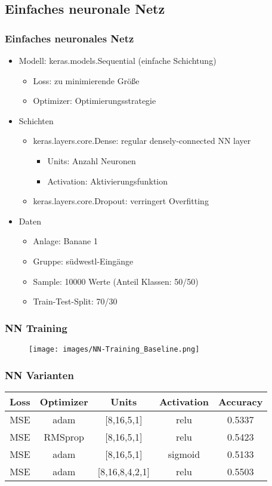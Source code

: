 \documentclass[utf8x, xcolor=dvipsnames]{beamer}
\begin{document}
\subsection{Einfaches neuronale Netz}
\begin{frame}
\frametitle{Einfaches neuronales Netz}
\begin{itemize}
	\item Modell: keras.models.Sequential (einfache Schichtung)
	\begin{itemize}
		\item Loss: zu minimierende Größe
		\item Optimizer: Optimierungsstrategie\newline
	\end{itemize}

	
	\item Schichten
	\begin{itemize}
		\item keras.layers.core.Dense: regular densely-connected NN layer
		\begin{itemize}
			\item Units: Anzahl Neuronen
			\item Activation: Aktivierungsfunktion
		\end{itemize}
		\item keras.layers.core.Dropout: verringert Overfitting\newline
	\end{itemize}
	
	\item Daten
	\begin{itemize}
		\item Anlage: Banane 1
		\item Gruppe: südwestl-Eingänge
		\item Sample: 10000 Werte (Anteil Klassen: 50/50)
		\item Train-Test-Split: 70/30
	\end{itemize}
\end{itemize}
\end{frame}

\begin{frame}
\frametitle{NN Training}
\begin{figure}
	\texttt{[image: images/NN-Training\_Baseline.png]}
\end{figure}
\end{frame}

\begin{frame}
\frametitle{NN Varianten}
\begin{tabular}{c|c|c|c|c}
	Loss & Optimizer & Units & Activation & Accuracy\\
	\hline
	MSE & adam    & [8,16,5,1]    & relu    & 0.5337\\
	MSE & RMSprop & [8,16,5,1]    & relu    & 0.5423\\
	MSE & adam    & [8,16,5,1]    & sigmoid & 0.5133\\
	MSE & adam    & [8,16,8,4,2,1]& relu    & 0.5503\\
\end{tabular}
\end{frame}
\end{document}
